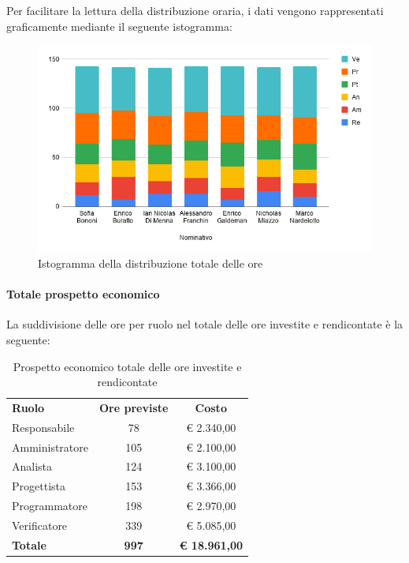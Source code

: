 \documentclass[../piano-di-progetto.tex]{subfiles}
\begin{document}
    Per facilitare la lettura della distribuzione oraria, i dati vengono rappresentati graficamente mediante il seguente istogramma:
    \begin{figure}[H]
      \centering
      \includegraphics[width=12cm]{img/ore-totale.png}
      \caption{Istogramma della distribuzione totale delle ore}
      \label{fig:ore-totali}
    \end{figure}

    \paragraph{Totale prospetto economico}
    La suddivisione delle ore per ruolo nel totale delle ore investite e rendicontate è la seguente:
    \begin{table}[H]
      \centering
      \begin{tabular}{lcc}
        \rowcolor{lightgray}
\textbf{Ruolo}  & \textbf{Ore previste} & \textbf{Costo}       \\
Responsabile    & 78                    & € 2.340,00           \\
Amministratore  & 105                   & € 2.100,00           \\
Analista        & 124                   & € 3.100,00           \\
Progettista     & 153                   & € 3.366,00           \\
Programmatore   & 198                   & € 2.970,00           \\
Verificatore    & 339                   & € 5.085,00           \\
\textbf{Totale} & \textbf{997}          & \textbf{€ 18.961,00}
      \end{tabular}
      \caption{Prospetto economico totale delle ore investite e rendicontate}
    \end{table}
\end{document}
